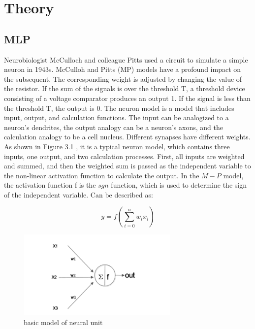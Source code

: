 \chapter{Theory}

\section{MLP}

Neurobiologist McCulloch and colleague Pitts used a circuit to simulate a simple neuron in 1943s.  McCulloh and Pitts (MP) models have a profound impact on the subsequent. The corresponding weight is adjusted by changing the value of the resistor.\cite{agirre2006regression}
If the sum of the signals is over the threshold T, a threshold device consisting of a voltage comparator produces an output 1. 
If the signal is less than the threshold T, the output is 0. The neuron model is a model that includes input, output, and calculation functions. The input can be analogized to a neuron's dendrites, the output analogy can be a neuron's axons, and the calculation analogy to be a cell nucleus. Different synapses have different weights. As shown in Figure 3.1 , it is a typical neuron model, which contains three inputs, one output, and two calculation processes. First, all inputs are weighted and summed, and then the weighted sum is passed as the independent variable to the non-linear activation function to calculate the output. In the $M-P$ model, the activation function f is the $sgn$ function, which is used to determine the sign of the independent variable. Can be described as:

\begin{equation}
	y=f(\sum_{i=0}^{n}w_{i}x_{i})
\end{equation}

\begin{figure}[!ht]
	\centering
	\includegraphics[width=0.7\textwidth]{mlp2.png}
	\caption{basic model of neural unit\label{fig:mlp1.png}}
\end{figure}


